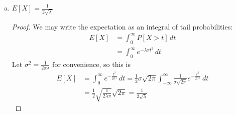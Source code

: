 \documentclass{article}
\begin{document}
\begin{itemize}
\begin{enumerate}[(a)]
			\item $E[X]=\frac{1}{2\sqrt{\lambda}}$
				\begin{proof}
					We may write the expectation as an integral of tail probabilities:
					\begin{align*}
						E[X] &= \int_0^\infty P[X>t] \, dt \\
						&= \int_0^\infty e^{-\lambda\pi t^2}\, dt
					\end{align*}
					Let $\sigma^2=\frac{1}{2\pi\lambda}$ for convenience, so this is
					\begin{align*}
						E[X] &= \int_0^\infty e^{-\frac{t^2}{2\sigma^2}}\, dt = \frac{1}{2} \sigma\sqrt{2\pi} \int_{-\infty}^\infty \frac{1}{\sigma\sqrt{2\pi}} e^{-\frac{t^2}{2\sigma^2}}\, dt \\
						&= \frac{1}{2} \sqrt{\frac{1}{2\lambda\pi}}\sqrt{2\pi} = \frac{1}{2\sqrt{\lambda}}
					\end{align*}
				\end{proof}

		\end{enumerate}

\end{itemize}
\end{document}
